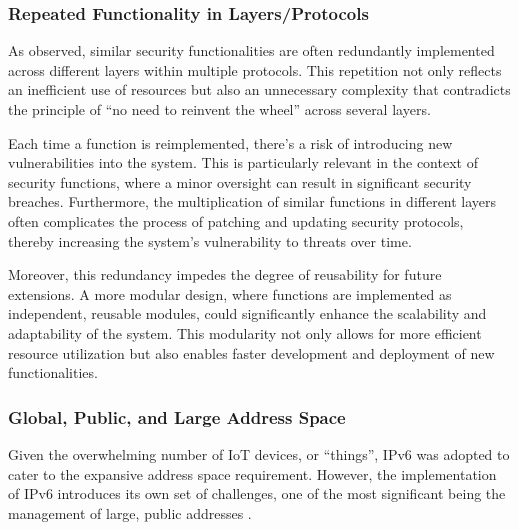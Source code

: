 \documentclass{ieeeaccess}
\begin{document}
\subsubsection{Repeated Functionality in Layers/Protocols}
As observed, similar security functionalities are often redundantly implemented across different layers within multiple protocols. This repetition not only reflects an inefficient use of resources but also an unnecessary complexity that contradicts the principle of ``no need to reinvent the wheel'' across several layers.

Each time a function is reimplemented, there's a risk of introducing new vulnerabilities into the system. This is particularly relevant in the context of security functions, where a minor oversight can result in significant security breaches. Furthermore, the multiplication of similar functions in different layers often complicates the process of patching and updating security protocols, thereby increasing the system's vulnerability to threats over time.

Moreover, this redundancy impedes the degree of reusability for future extensions. A more modular design, where functions are implemented as independent, reusable modules, could significantly enhance the scalability and adaptability of the system. This modularity not only allows for more efficient resource utilization but also enables faster development and deployment of new functionalities.

\subsubsection{Global, Public, and Large Address Space}
Given the overwhelming number of IoT devices, or ``things'', IPv6 was adopted to cater to the expansive address space requirement. However, the implementation of IPv6 introduces its own set of challenges, one of the most significant being the management of large, public addresses \cite{das2023recent}.
\end{document}
